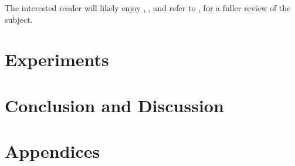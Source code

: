 \documentclass[twoside,11pt]{report}
\begin{document}
The interested reader will likely enjoy \cite{mouvement-brownien-calcul-ito}, \cite{sarkka_applied_2019}, and refer to \cite{cours-jf-legall}, for a fuller review of the subject.

    
    
    

    
    

    
    

\part{Experiments}

    

\part{Conclusion and Discussion}

    

\part{Appendices}
\begin{appendices}
    
\end{appendices}

\clearpage

\printglossary
\clearpage


\printbibliography
\clearpage
\end{document}
